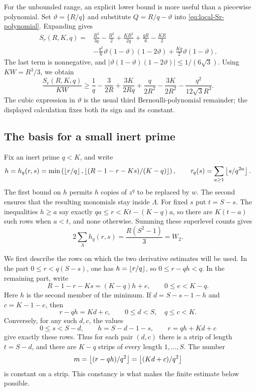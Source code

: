 For the unbounded range, an explicit lower bound is more useful than a
piecewise polynomial. Set $\vartheta=\{R/q\}$ and substitute
$Q=R/q-\vartheta$ into \eqref{eq:local-Sr-polynomial}. Expanding gives
\begin{align*}
 S_r(R,K,q)={}&\frac{R^3}{3q}-\frac{R^2}2
 +\frac{KR^2}{2q}+\frac{qR}6-\frac{KR}2\\
 &-\frac{q^2}{6}\vartheta(1-\vartheta)(1-2\vartheta)
 +\frac{Kq}{2}\vartheta(1-\vartheta).
\end{align*}
The last term is nonnegative, and
$|\vartheta(1-\vartheta)(1-2\vartheta)|\leq1/(6\sqrt3)$.
Using $KW=R^3/3$, we obtain
\begin{equation}\label{eq:local-Bernoulli}
 \frac{S_r(R,K,q)}{KW}\geq
 \frac1q-\frac{3}{2R}+\frac{3K}{2Rq}
 +\frac{q}{2R^2}-\frac{3K}{2R^2}
 -\frac{q^2}{12\sqrt3 R^3}.
\end{equation}
The cubic expression in $\vartheta$ is the usual third Bernoulli-polynomial
remainder; the displayed calculation fixes both its sign and its constant.

\subsection{The basis for a small inert prime}
Fix an inert prime $q<K$, and write
\[
 h=h_q(r,s)=\min\left(\left\lfloor r/q\right\rfloor,
       \left\lfloor (R-1-r-Ks)/(K-q)\right\rfloor\right),\qquad
 \tau_q(s)=\sum_{a\geq1}\left\lfloor s/q^{2a}\right\rfloor.
\]
The first bound on $h$ permits $h$ copies of $z^q$ to be replaced by $w$.
The second ensures that the resulting monomials stay inside $\Lambda$.
For fixed $s$ put $t=S-s$. The inequalities $h\geq a$ say exactly
$qa\leq r<Kt-(K-q)a$, so there are $K(t-a)$ such rows when $a<t$,
and none otherwise. Summing these superlevel counts gives
\begin{equation}\label{eq:local-h-sum}
 2\sum_\Lambda h_q(r,s)=\frac{R(S^2-1)}3=W_2.
\end{equation}

We first describe the rows on which the two derivative estimates will be
used. In the part $0\leq r<q(S-s)$, one has $h=\left\lfloor r/q\right\rfloor$, so
$0\leq r-qh<q$. In the remaining part, write
\[
 R-1-r-Ks=(K-q)h+e,\qquad 0\leq e<K-q.
\]
Here $h$ is the second member of the minimum. If
$d=S-s-1-h$ and $c=K-1-e$, then
\begin{equation}\label{eq:local-strip}
 r-qh=Kd+c,\qquad 0\leq d<S,\quad q\leq c<K.
\end{equation}
Conversely, for any such $d,c$, the values
\[
 0\leq s<S-d,\qquad h=S-d-1-s,\qquad r=qh+Kd+c
\]
give exactly these rows. Thus for each pair $(d,c)$ there is a strip of
length $t=S-d$, and there are $K-q$ strips of every length
$1,\ldots,S$. The number
\[
 m=\left\lfloor (r-qh)/q^2\right\rfloor=\left\lfloor (Kd+c)/q^2\right\rfloor
\]
is constant on a strip. This constancy is what makes the finite estimate
below possible.

